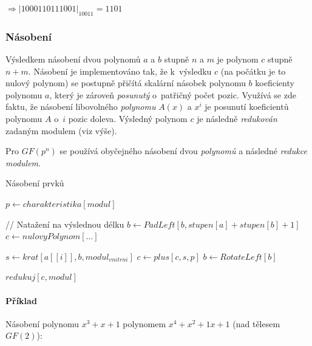 \documentclass[thesis=M,czech,hidelinks]{FITthesis}[2012/06/26]
\newcommand{\0}{{\textcolor[gray]{0.80}{0}}}
\newenvironment{algoritmus}{
    \floatname{algorithm}{Algoritmus}
    \begin{algorithm}
}{\end{algorithm}}
\begin{document}
$\Rightarrow \left|1000110111001\right|_{10011} = 1101$

\subsubsection{Násobení}
Výsledkem násobení dvou polynomů $a$ a $b$ stupně $n$ a $m$ je polynom $c$
stupně $n+m$. Násobení je implementováno tak, že k~výsledku $c$ (na počátku
je to nulový polynom) se postupně přičítá skalární násobek polynomu $b$
koeficienty polynomu $a$, který je zároveň \emph{posunutý} o~patřičný počet
pozic. Využívá se zde faktu, že násobení libovolného \emph{polynomu} $A(x)$
a $x^i$ je posunutí koeficientů polynomu $A$ o~$i$ pozic doleva. Výsledný
polynom $c$ je následně \emph{redukován} zadaným modulem (viz výše).

Pro $GF(p^n)$ se používá obyčejného násobení dvou \emph{polynomů}
a následné \emph{redukce} \emph{modulem}.

\begin{algoritmus}[!ht]
    \caption{Násobení prvků}
    \begin{algorithmic}[1]
        \State $ p \gets charakteristika[ modul ] $

        // Natažení na výslednou délku
        \State $ b \gets PadLeft[ b, stupen[a] + stupen[b] + 1 ] $
        \State $ c \gets nulovyPolynom[\ldots ] $

        \hfil
            \State $ s \gets krat[ a[[i]], b, modul_{vnitrni} ] $
            \State $ c \gets plus[ c, s, p ] $
            \State $ b \gets RotateLeft[b] $
        \EndFor

        \hfil
        \State \Return $redukuj[c,modul]$
     \EndFunction
    \end{algorithmic}
\end{algoritmus}

\paragraph{Příklad} Násobení polynomu $x^3+x+1$ polynomem
$x^4+x^2+1x+1$ (nad tělesem $GF(2)$):
\end{document}
